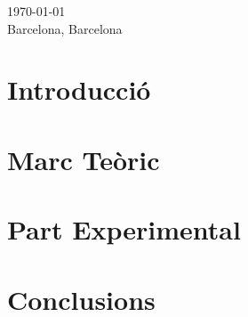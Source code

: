 \documentclass[a4paper,12pt,arial,numbered,print,index,oneside]{book}
\newcommand\blankpage{%
	\null
	\thispagestyle{empty}%
	\addtocounter{page}{-1}%
	\newpage}
\let\LaTeXStandardTableOfContents\tableofcontents
\renewcommand{\tableofcontents}{%
	\begingroup%
	\renewcommand{\bfseries}{\relax}%
	\LaTeXStandardTableOfContents%
	\endgroup%
}%
\begin{document}
\begin{titlepage}
		
		\vspace{.4cm}
		
		
		{\large \today} \\
		\large Barcelona, Barcelona  
		
		
		\vfill %
		
	\end{titlepage}

	
	\onehalfspacing
	\setlength{\parskip}{0.5cm plus4mm minus3mm}
	\afterpage{\blankpage}
	
	\tableofcontents
	
	\clearpage
	
	\thispagestyle{plain}
	
	\part*{Introducció}
	\label{part:intro}
	
	
	\part{Marc Teòric}
	\label{part:theoretical_framework}
	
	
	\part{Part Experimental}
	\label{part:experimental_work}
	
	
	\part{Conclusions}
	\label{part:conclusions}
	
	
	\printglossaries
	
	
	\begin{appendices}
		
	\end{appendices}

	
	
	
\end{document}
